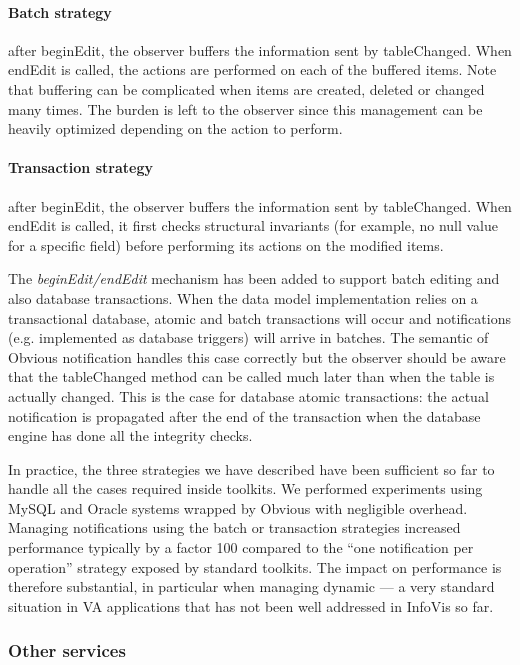 \paragraph{Batch strategy} after beginEdit, the observer buffers the
  information sent by tableChanged.  When endEdit is called, the
  actions are performed on each of the buffered items.  Note that 
  buffering can be complicated when items are created, deleted or
  changed many times.  The burden is left to the observer since this
  management can be heavily optimized depending on the action to
  perform.

\paragraph{Transaction strategy} after beginEdit, the observer buffers the
  information sent by tableChanged.  When endEdit is called, it first
  checks structural invariants (for example, no null value for a
  specific field) before performing its actions on the modified items.

The \emph{beginEdit/endEdit} mechanism has been added to support batch
editing and also database transactions.  When the data model
implementation relies on a transactional database, atomic and batch
transactions will occur and notifications (e.g. implemented as
database triggers) will arrive in batches.  The semantic of Obvious
notification handles this case correctly but the observer should be
aware that the tableChanged method can be called much later than when
the table is actually changed.  This is the case for database atomic
transactions: the actual notification is propagated after the end of
the transaction when the database engine has done all the integrity
checks.

In practice, the three strategies we have described have been
sufficient so far to handle all the cases required inside toolkits.
We performed experiments using MySQL and Oracle systems wrapped by
Obvious with negligible overhead.  Managing notifications using the
batch or transaction strategies increased performance typically by a
factor 100 compared to the ``one notification per operation'' strategy
exposed by standard toolkits.  The impact on performance is therefore
substantial, in particular when managing dynamic --- a very standard
situation in VA applications that has not been well addressed in
InfoVis so far.


\subsubsection{Other services}

